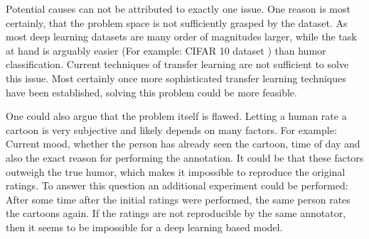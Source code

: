 \documentclass[draft,final,oneside]{vutinfth} %
\begin{document}
Potential causes can not be attributed to exactly one issue. One reason is most certainly, that the problem space is not sufficiently grasped by the dataset. As most deep learning datasets are many order of magnitudes larger, while the task at hand is arguably easier (For example: CIFAR 10 dataset \cite{dogsvscats}) than humor classification. Current techniques of transfer learning are not sufficient to solve this issue. Most certainly once more sophisticated transfer learning techniques have been established, solving this problem could be more feasible. 

One could also argue that the problem itself is flawed. Letting a human rate a
cartoon is very subjective and likely depends on many factors. For example: Current mood, whether the person has already seen the cartoon, time of day and also the exact reason for performing the annotation. It could be that these factors outweigh the true humor, which makes it impossible to reproduce the original ratings. To answer this question an additional experiment could be performed: After some time after the initial ratings were performed, the same person rates the cartoons again. If the ratings are not reproducible by the same annotator, then it seems to be impossible for a deep learning based model.




\backmatter

\listoffigures %








\end{document}
